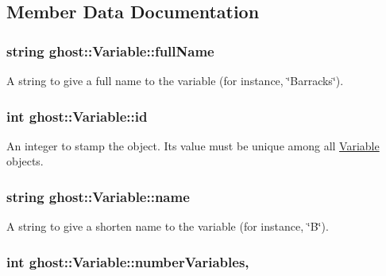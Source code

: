 \subsection{Member Data Documentation}
\hypertarget{classghost_1_1Variable_a87dc1fa73726f887a7ecbd5b9bfa7cab}{
\subsubsection[{full\-Name}]{\setlength{\rightskip}{0pt plus 5cm}string ghost\-::\-Variable\-::full\-Name\hspace{0.3cm}{\ttfamily [protected]}}}\label{classghost_1_1Variable_a87dc1fa73726f887a7ecbd5b9bfa7cab}


A string to give a full name to the variable (for instance, \char`\"{}\-Barracks\char`\"{}). 

\hypertarget{classghost_1_1Variable_a3b1cd0e87cecbb58e115a9000be26f28}{
\subsubsection[{id}]{\setlength{\rightskip}{0pt plus 5cm}int ghost\-::\-Variable\-::id\hspace{0.3cm}{\ttfamily [protected]}}}\label{classghost_1_1Variable_a3b1cd0e87cecbb58e115a9000be26f28}


An integer to stamp the object. Its value must be unique among all \hyperlink{classghost_1_1Variable}{Variable} objects. 

\hypertarget{classghost_1_1Variable_a05cf4a4cd3a5c033028e0b0f11d1dafd}{
\subsubsection[{name}]{\setlength{\rightskip}{0pt plus 5cm}string ghost\-::\-Variable\-::name\hspace{0.3cm}{\ttfamily [protected]}}}\label{classghost_1_1Variable_a05cf4a4cd3a5c033028e0b0f11d1dafd}


A string to give a shorten name to the variable (for instance, \char`\"{}\-B\char`\"{}). 

\hypertarget{classghost_1_1Variable_a6c9862568c3f951afc4ef8dc75b874cf}{
\subsubsection[{number\-Variables}]{\setlength{\rightskip}{0pt plus 5cm}int ghost\-::\-Variable\-::number\-Variables\hspace{0.3cm}{\ttfamily [static]}, {\ttfamily [private]}}}\label{classghost_1_1Variable_a6c9862568c3f951afc4ef8dc75b874cf}


